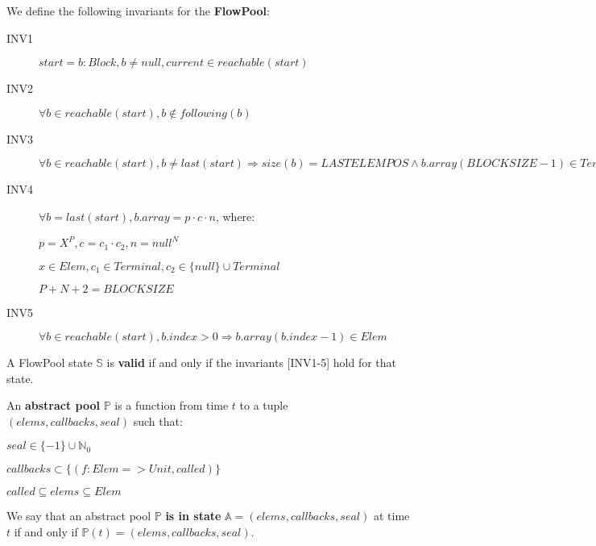 \documentclass[runningheads,a4paper]{llncs}
\begin{document}
\begin{definition}[Invariants]
We define the following invariants for the \textbf{FlowPool}:
\begin{description}
\item[INV1] $start = b: Block, b \neq null, current \in reachable(start)$
\item[INV2] $\forall b \in reachable(start), b \not \in following(b)$
\item[INV3] $\forall b \in reachable(start), b \neq last(start) \Rightarrow size(b) = LASTELEMPOS \wedge b.array(BLOCKSIZE - 1) \in Terminal$
\item[INV4]
$\forall b = last(start), b.array = p \cdot c \cdot n$, where:

$p = X^P, c = c_1 \cdot c_2, n = null^N$

$x \in Elem, c_1 \in Terminal, c_2 \in \{null\} \cup Terminal$

$P + N + 2 = BLOCKSIZE$
\item[INV5] $\forall b \in reachable(start), b.index > 0 \Rightarrow b.array(b.index - 1) \in Elem$
\end{description}
\end{definition}


\begin{definition}[Validity]
A FlowPool state $\mathbb{S}$ is \textbf{valid} if and only if the invariants [INV1-5] hold for that state.
\end{definition}


\begin{definition}
An \textbf{abstract pool} $\mathbb{P}$ is a function from time $t$ to a tuple $(elems, callbacks, seal)$ such that:
\begin{description}
\item $seal \in \{ -1 \} \cup \mathbb{N}_0$
\item $callbacks \subset \{ (f: Elem => Unit, called) \}$
\item $called \subseteq elems \subseteq Elem$
\end{description}
We say that an abstract pool $\mathbb{P}$ \textbf{is in state}
$\mathbb{A} = (elems, callbacks, seal)$ at time $t$ if and only if $\mathbb{P}(t) = (elems, callbacks, seal)$.
\end{definition}
\end{document}
